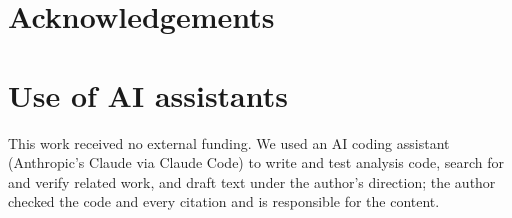 \documentclass[11pt]{article}
\begin{document}
\ifdefined\PREPRINT\section*{Acknowledgements}\else\section*{Use of AI assistants}\fi
\ifdefined\PREPRINT This work received no external funding. \fi We used an AI coding assistant (Anthropic's Claude via Claude Code) to write and test analysis code, search for and verify related work, and draft text under the author's direction; the author checked the code and every citation and is responsible for the content.


\end{document}
